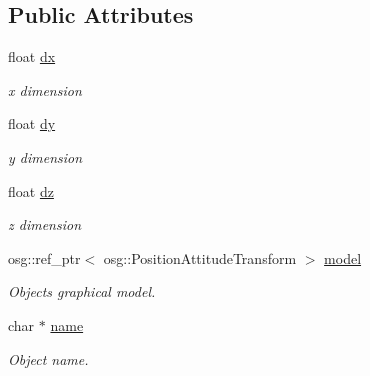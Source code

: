 \subsection*{Public Attributes}
\begin{DoxyCompactItemize}
\item 
\mbox{\label{classbtosgBox_a1d1e4744d9e377e1462ea097dacef716}} 
float \hyperlink{classbtosgBox_a1d1e4744d9e377e1462ea097dacef716}{dx}
\begin{DoxyCompactList}\small\item\em x dimension \end{DoxyCompactList}\item 
\mbox{\label{classbtosgBox_a7665337187adb52a1ce3b4cf2819217d}} 
float \hyperlink{classbtosgBox_a7665337187adb52a1ce3b4cf2819217d}{dy}
\begin{DoxyCompactList}\small\item\em y dimension \end{DoxyCompactList}\item 
\mbox{\label{classbtosgBox_a1dd905f6afb684d5d364f2b211dbab97}} 
float \hyperlink{classbtosgBox_a1dd905f6afb684d5d364f2b211dbab97}{dz}
\begin{DoxyCompactList}\small\item\em z dimension \end{DoxyCompactList}\item 
\mbox{\label{classbtosgObject_afd15726e7a214212d6d5815f8ac1ac6c}} 
osg\+::ref\+\_\+ptr$<$ osg\+::\+Position\+Attitude\+Transform $>$ \hyperlink{classbtosgObject_afd15726e7a214212d6d5815f8ac1ac6c}{model}
\begin{DoxyCompactList}\small\item\em Object\textquotesingle{}s graphical model. \end{DoxyCompactList}\item 
\mbox{\label{classbtosgObject_a12396e1362797a75473a2e833b579cc9}} 
char $\ast$ \hyperlink{classbtosgObject_a12396e1362797a75473a2e833b579cc9}{name}
\begin{DoxyCompactList}\small\item\em Object name. \end{DoxyCompactList}\item 
\mbox{\label{classbtosgObject_a2dee023f311114e200df9b04c8c1b400}} 

\end{DoxyCompactItemize}
